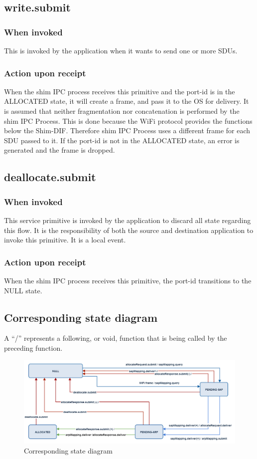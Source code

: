 \subsection{write.submit}
\subsubsection{When invoked}
This is invoked by the application when it wants to send one or more SDUs. 
\subsubsection{Action upon receipt}
When the shim IPC process receives this primitive and the port-id is in the ALLOCATED state, it will create a frame, and pass it to the OS for delivery. It is assumed that neither fragmentation nor concatenation is performed by the shim IPC Process. This is done because the WiFi protocol provides the functions below the Shim-DIF. Therefore shim IPC Process uses a different frame for each SDU passed to it. If the port-id is not in the ALLOCATED state, an error is generated and the frame is dropped. 


\subsection{deallocate.submit}
\subsubsection{When invoked}
This service primitive is invoked by the application to discard all state regarding this flow. It is the responsibility of both the source and destination application to invoke this primitive. It is a local event.
\subsubsection{Action upon receipt}
When the shim IPC process receives this primitive, the port-id transitions to the NULL state.


\subsection{Corresponding state diagram}

A ``/'' represents a following, or void, function that is being called by the preceding function. 

\begin{figure}[H]
    \centering
    \includegraphics[height=0.6\textwidth, angle=270]{figures/state_diagram2}
    \caption{Corresponding state diagram} 
    \label{fig:state_diagram}
\end{figure}

